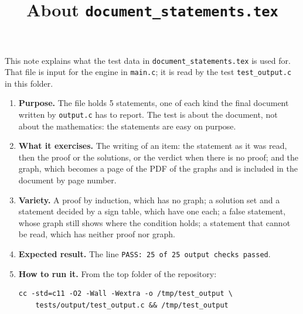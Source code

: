 \documentclass[11pt,a4paper]{article}
\title{About \texttt{document\_statements.tex}}
\author{}
\date{}
\begin{document}
\maketitle
This note explains what the test data in \texttt{document\_statements.tex} is used for. That file is input for the engine in \texttt{main.c}; it is read by the test \texttt{test\_output.c} in this folder.

\begin{enumerate}
\item \textbf{Purpose.} The file holds 5 statements, one of each kind the final document written by \texttt{output.c} has to report. The test is about the document, not about the mathematics: the statements are easy on purpose.

\item \textbf{What it exercises.} The writing of an item: the statement as it was read, then the proof or the solutions, or the verdict when there is no proof; and the graph, which becomes a page of the PDF of the graphs and is included in the document by page number.

\item \textbf{Variety.} A proof by induction, which has no graph; a solution set and a statement decided by a sign table, which have one each; a false statement, whose graph still shows where the condition holds; a statement that cannot be read, which has neither proof nor graph.

\item \textbf{Expected result.} The line \texttt{PASS: 25 of 25 output checks passed}.

\item \textbf{How to run it.} From the top folder of the repository:
\begin{verbatim}
cc -std=c11 -O2 -Wall -Wextra -o /tmp/test_output \
    tests/output/test_output.c && /tmp/test_output
\end{verbatim}
\end{enumerate}
\end{document}
